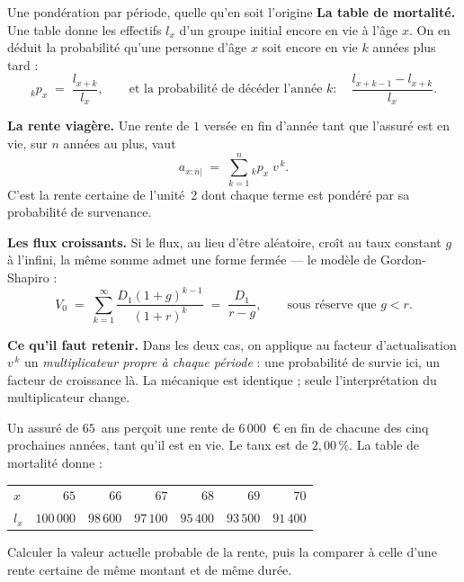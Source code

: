 \begin{generalisation}{Une pondération par période, quelle qu'en soit l'origine}
\textbf{La table de mortalité.} Une table donne les effectifs $l_x$ d'un groupe
initial encore en vie à l'âge $x$. On en déduit la probabilité qu'une personne
d'âge $x$ soit encore en vie $k$ années plus tard :
\[
  {}_{k}p_x \;=\; \frac{l_{x+k}}{l_x},
  \qquad\text{et la probabilité de décéder l'année } k :\quad
  \frac{l_{x+k-1}-l_{x+k}}{l_x}.
\]

\medskip
\textbf{La rente viagère.} Une rente de $1$ versée en fin d'année tant que
l'assuré est en vie, sur $n$ années au plus, vaut
\[
  a_{x:\overline{n}|} \;=\; \sum_{k=1}^{n} {}_{k}p_x \; v^{\,k}.
\]
C'est la rente certaine de l'unité~2 dont chaque terme est pondéré par sa
probabilité de survenance.

\medskip
\textbf{Les flux croissants.} Si le flux, au lieu d'être aléatoire, croît au
taux constant $g$ à l'infini, la même somme admet une forme fermée --- le modèle
de Gordon-Shapiro :
\[
  V_0 \;=\; \sum_{k=1}^{\infty} \frac{D_1 (1+g)^{k-1}}{(1+r)^{k}}
       \;=\; \frac{D_1}{r-g},
  \qquad\text{sous réserve que } g < r .
\]

\medskip
\textbf{Ce qu'il faut retenir.} Dans les deux cas, on applique au facteur
d'actualisation $v^{\,k}$ un \emph{multiplicateur propre à chaque période} :
une probabilité de survie ici, un facteur de croissance là. La mécanique est
identique ; seule l'interprétation du multiplicateur change.
\end{generalisation}

\begin{exercice}
Un assuré de $65$~ans perçoit une rente de $6\,000$~\euro{} en fin de chacune
des cinq prochaines années, tant qu'il est en vie. Le taux est de $2{,}00\,\%$.
La table de mortalité donne :
\begin{center}\small
\begin{tabular}{lrrrrrr}
\toprule
$x$   & $65$ & $66$ & $67$ & $68$ & $69$ & $70$ \\
$l_x$ & $100\,000$ & $98\,600$ & $97\,100$ & $95\,400$ & $93\,500$ & $91\,400$ \\
\bottomrule
\end{tabular}
\end{center}
Calculer la valeur actuelle probable de la rente, puis la comparer à celle d'une
rente certaine de même montant et de même durée.
\end{exercice}


